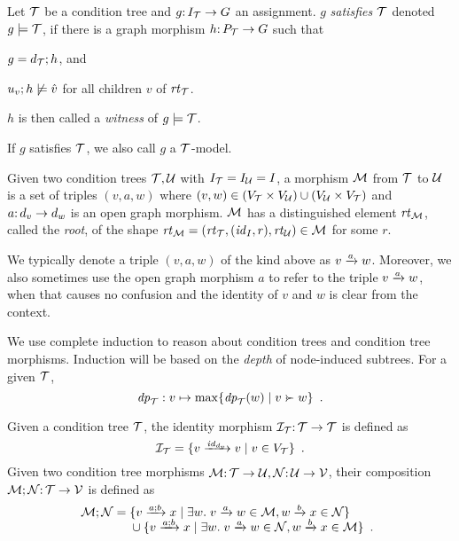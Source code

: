 \begin{definition}[satisfaction]\label{def:satisfaction}
Let ${\mathcal{T}}$ be a condition tree and $g{:}\, I_{\mathcal{T}}\rightarrow G$ an assignment. $g$ \emph{satisfies ${\mathcal{T}}$} denoted $g\models {\mathcal{T}}$, if there is a graph morphism $h{:}\, P_{\mathcal{T}}\rightarrow G$ such that
\begin{inumerate}
\item $g=d_{\mathcal{T}};h$, and 
\item $u_v;h\not\models \hat v$ for all children $v$ of $\mathit{rt}_{{\mathcal{T}}}$.
\end{inumerate}
$h$ is then called a \emph{witness} of $g\models {\mathcal{T}}$.
\end{definition}
%
If $g$ satisfies ${\mathcal{T}}$, we also call $g$ a ${\mathcal{T}}$-model.


\begin{definition}[morphism]
Given two condition trees ${\mathcal{T}},{\mathcal{U}}$ with $I_{\mathcal{T}}=I_{\mathcal{U}}=I$, a morphism ${\mathcal{M}}$ from ${\mathcal{T}}$ to ${\mathcal{U}}$ is a set of triples $(v,a,w)$ where $(v,w)\in (V_{\mathcal{T}}\times V_{\mathcal{U}})\cup (V_{\mathcal{U}}\times V_{\mathcal{T}})$ and $a{:}\, d_v\rightarrow d_w$ is an open graph morphism. ${\mathcal{M}}$ has a distinguished element $\mathit{rt}_{{\mathcal{M}}}$, called the \emph{root}, of the shape $\mathit{rt}_{{\mathcal{M}}}=(\mathit{rt}_{{\mathcal{T}}},({\mathit{id}}_I,r),\mathit{rt}_{{\mathcal{U}}})\in {\mathcal{M}}$ for some $r$.
\end{definition}
%
We typically denote a triple $(v,a,w)$ of the kind above as $\trip vaw$. Moreover, we also sometimes use the open graph morphism $a$ to refer to the triple $\trip vaw$, when that causes no confusion and the identity of $v$ and $w$ is clear from the context.

We use complete induction to reason about condition trees and condition tree morphisms. Induction will be based on the \emph{depth} of node-induced subtrees. For a given ${\mathcal{T}}$,
%
\[ \depth_\cT: v\mapsto \max \gensetof{\depth_\cT(w)}{v\childof w} \enspace. \]


\medskip\noindent
Given a condition tree ${\mathcal{T}}$, the identity morphism ${\mathcal{I}}_{\mathcal{T}}{:}\, {\mathcal{T}}\rightarrow{\mathcal{T}}$ is defined as
\[ \cI_\cT = \setof{\trip v{\id_{d_v}}v \mid v\in V_\cT} \enspace. \]
Given two condition tree morphisms ${\mathcal{M}}{:}\, {\mathcal{T}}\rightarrow {\mathcal{U}},{\mathcal{N}}{:}\, {\mathcal{U}}\rightarrow {\mathcal{V}}$, their composition ${\mathcal{M}};{\mathcal{N}}{:}\, {\mathcal{T}}\rightarrow {\mathcal{V}}$ is defined as
\[ \cM;\cN =
\begin{array}[t]{@{}l}
	\setof{\trip v{a;b}x \mid \exists w\st \trip v a w\in\cM, \trip wbx\in \cN} \\
	{}\cup \setof{\trip v{a;b}x \mid \exists w\st \trip vaw\in\cN, \trip wbx\in\cM} \enspace.
\end{array}
\]

